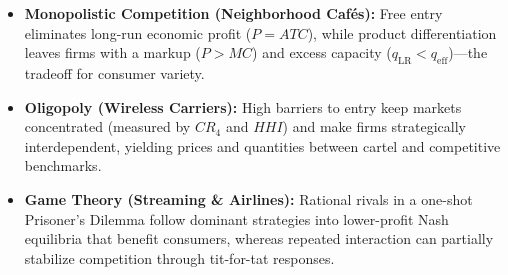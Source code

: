 \documentclass[11pt,letterpaper]{article}
\begin{document}
\begin{takeaways}
\begin{itemize}
    \item \textbf{Monopolistic Competition (Neighborhood Cafés):} Free entry eliminates long-run economic profit ($P = ATC$), while product differentiation leaves firms with a markup ($P > MC$) and excess capacity ($q_{\text{LR}} < q_{\text{eff}}$)—the tradeoff for consumer variety.
    \item \textbf{Oligopoly (Wireless Carriers):} High barriers to entry keep markets concentrated (measured by $CR_4$ and $HHI$) and make firms strategically interdependent, yielding prices and quantities between cartel and competitive benchmarks.
    \item \textbf{Game Theory (Streaming \& Airlines):} Rational rivals in a one-shot Prisoner's Dilemma follow dominant strategies into lower-profit Nash equilibria that benefit consumers, whereas repeated interaction can partially stabilize competition through tit-for-tat responses.
\end{itemize}
\end{takeaways}
\end{document}
